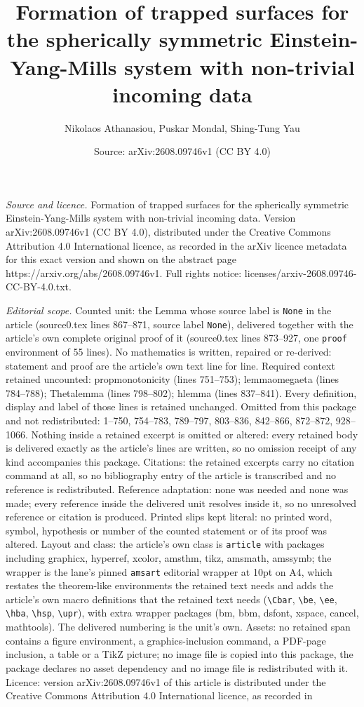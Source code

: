 \documentclass[10pt,a4paper]{amsart}
\title[Formation of trapped surfaces for the spherically symmetric ]{Formation of trapped surfaces for the spherically symmetric Einstein-Yang-Mills system with non-trivial incoming data}
\author{Nikolaos Athanasiou, Puskar Mondal, Shing-Tung Yau}
\date{Source: arXiv:2608.09746v1 (CC BY 4.0)}
\begin{document}
\maketitle

\noindent\emph{Source and licence.} Formation of trapped surfaces for the spherically symmetric Einstein-Yang-Mills system with non-trivial incoming data. Version arXiv:2608.09746v1 (CC BY 4.0), distributed under the Creative Commons Attribution 4.0 International licence, as recorded in the arXiv licence metadata for this exact version and shown on the abstract page https://arxiv.org/abs/2608.09746v1. Full rights notice: licenses/arxiv-2608.09746-CC-BY-4.0.txt.\par\smallskip

\noindent\textit{Editorial scope.} Counted unit: the Lemma whose source label is \texttt{None} in the article (source0.tex lines 867--871, source label \texttt{None}), delivered together with the article's own complete original proof of it (source0.tex lines 873--927, one \texttt{proof} environment of 55 lines). No mathematics is written, repaired or re-derived: statement and proof are the article's own text line for line. Required context retained uncounted: propmonotonicity (lines 751--753); lemmaomegaeta (lines 784--788); Thetalemma (lines 798--802); hlemma (lines 837--841). Every definition, display and label of those lines is retained unchanged. Omitted from this package and not redistributed: 1--750, 754--783, 789--797, 803--836, 842--866, 872--872, 928--1066. Nothing inside a retained excerpt is omitted or altered: every retained body is delivered exactly as the article's lines are written, so no omission receipt of any kind accompanies this package. Citations: the retained excerpts carry no citation command at all, so no bibliography entry of the article is transcribed and no reference is redistributed. Reference adaptation: none was needed and none was made; every reference inside the delivered unit resolves inside it, so no unresolved reference or citation is produced. Printed slips kept literal: no printed word, symbol, hypothesis or number of the counted statement or of its proof was altered. Layout and class: the article's own class is \texttt{article} with packages including graphicx, hyperref, xcolor, amsthm, tikz, amsmath, amssymb; the wrapper is the lane's pinned \texttt{amsart} editorial wrapper at 10pt on A4, which restates the theorem-like environments the retained text needs and adds the article's own macro definitions that the retained text needs (\texttt{\textbackslash Cbar}, \texttt{\textbackslash be}, \texttt{\textbackslash ee}, \texttt{\textbackslash hba}, \texttt{\textbackslash hsp}, \texttt{\textbackslash upr}), with extra wrapper packages (bm, bbm, dsfont, xspace, cancel, mathtools). The delivered numbering is the unit's own. Assets: no retained span contains a figure environment, a graphics-inclusion command, a PDF-page inclusion, a table or a TikZ picture; no image file is copied into this package, the package declares no asset dependency and no image file is redistributed with it. Licence: version arXiv:2608.09746v1 of this article is distributed under the Creative Commons Attribution 4.0 International licence, as recorded in 
\end{document}
